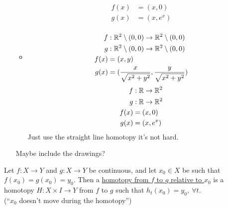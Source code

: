 \documentclass[../notes.tex]{subfiles}
\begin{document}
\begin{itemize}
\begin{itemize}
\begin{align*}
                        f(x)&=(x,0)\\
                        g(x)&=(x,e^x)\\
                    \end{align*}
                \item
                    \begin{align*}
                        f&: \mathbb{R}^2\setminus{(0,0)} \rightarrow \mathbb{R}^2\setminus{(0,0)}\\
                        g&: \mathbb{R}^2\setminus{(0,0)} \rightarrow \mathbb{R}^2\setminus{(0,0)}\\
                        f(x)&=(x,y)\\
                        g(x)&=(\frac{x}{\sqrt{x^2+y^2}},\frac{y}{\sqrt{x^2+y^2}})\\
                    \end{align*}
                    \begin{align*}
                        f&: \mathbb{R} \rightarrow \mathbb{R}^2\\
                        g&: \mathbb{R} \rightarrow \mathbb{R}^2\\
                        f(x)&=(x,0)\\
                        g(x)&=(x,e^x)\\
                    \end{align*}
                    Just use the straight line homotopy it's not hard.
            \end{itemize}
            Maybe include the drawings?
    \end{itemize}
        \begin{definition}
            Let $f:X\rightarrow Y$ and $g: X\rightarrow Y$ be continuous,
            and let $x_0 \in X$ be such that $f(x_0)=g(x_0)=y_0$. Then a
            \underline{homotopy from $f$ to $g$ relative to $x_0$} is a homotopy $H:X\times I \rightarrow Y$
            from $f$ to $g$ such that $h_t(x_0)=y_0,\ \forall t$.\\
            (``$x_0$ doesn't move during the homotopy'')
        \end{definition}
\end{document}
